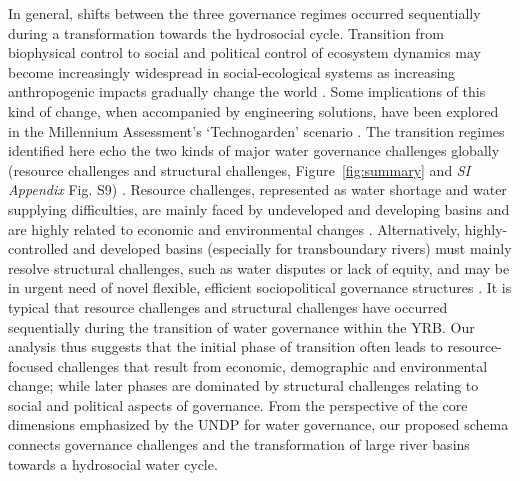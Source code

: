 \documentclass[9pt, twocolumn, twoside, lineno]{pnas-new}
\begin{document}
In general, shifts between the three governance regimes occurred sequentially during a transformation towards the hydrosocial cycle.
Transition from biophysical control to social and political control of ecosystem dynamics may become increasingly widespread in social-ecological systems as increasing anthropogenic impacts gradually change the world  
\cite{bestPaceHumanInducedChange2020,cummingLinkingEconomicGrowth2018,cummingImplicationsAgriculturalTransitions2014}.
Some implications of this kind of change, when accompanied by engineering solutions, have been explored in the Millennium Assessment’s `Technogarden' scenario 
\cite{millenniumecosystemassessmentprogramEcosystemshumanwellbeing2005}.
The transition regimes identified here echo the two kinds of major water governance challenges globally (resource challenges and structural challenges, Figure~\ref{fig:summary} and \textit{SI Appendix} Fig. S9)
\cite{singh2019,porcher2019}.
Resource challenges, represented as water shortage and water supplying difficulties, are mainly faced by undeveloped and developing basins and are highly related to economic and environmental changes
\cite{allan2019,florke2018,liuWaterSustainabilityChina2012}. 
Alternatively, highly-controlled and developed basins (especially for transboundary rivers) must mainly resolve structural challenges, such as water disputes or lack of equity, and may be in urgent need of novel flexible, efficient sociopolitical governance structures 
\cite{kitroeff2020,roobavannan2017,unep-dhiTransboundaryRiverBasins2016}.
It is typical that resource challenges and structural challenges have occurred sequentially during the transition of water governance within the YRB. 
Our analysis thus suggests that the initial phase of transition often leads to resource-focused challenges that result from economic, demographic and environmental change; while later phases are dominated by structural challenges relating to social and political aspects of governance.
From the perspective of the core dimensions emphasized by the UNDP for water governance, our proposed schema connects governance challenges and the transformation of large river basins towards a hydrosocial water cycle. 
\end{document}
